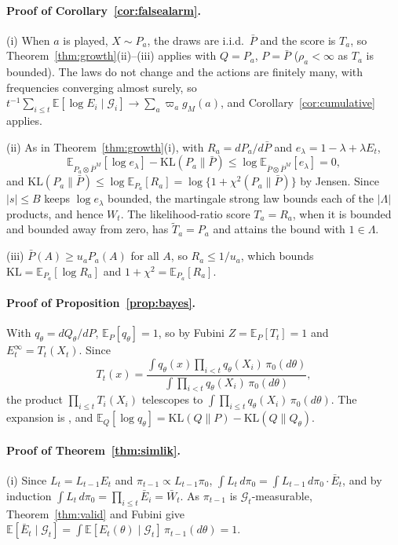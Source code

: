 \documentclass[12pt]{article}
\newcommand{\E}{\mathbb{E}}
\newcommand{\KL}{\mathrm{KL}}
\newcommand{\G}{\mathcal{G}}
\theoremstyle{remark}
\begin{document}
\paragraph{Proof of Corollary~\ref{cor:falsealarm}.}
(i) When $a$ is played, $X \sim P_a$, the draws are i.i.d.\ $\bar P$ and the
score is $T_a$, so Theorem~\ref{thm:growth}(ii)--(iii) applies with $Q = P_a$,
$P = \bar P$ ($\rho_a < \infty$ as $T_a$ is bounded). The laws do not change and
the actions are finitely many, with frequencies converging almost surely, so
$t^{-1}\sum_{i \le t}\E[\log E_i \mid \G_i] \to \sum_a \varpi_a g_M(a)$, and
Corollary~\ref{cor:cumulative} applies.

(ii) As in Theorem~\ref{thm:growth}(i), with $R_a = dP_a/d\bar P$ and
$e_\lambda = 1 - \lambda + \lambda E_t$,
\[
\E_{P_a \otimes \bar P^M}[\log e_\lambda] - \KL(P_a\|\bar P)
\le \log \E_{\bar P \otimes \bar P^M}[e_\lambda] = 0,
\]
and $\KL(P_a\|\bar P) \le \log\E_{P_a}[R_a] = \log\{1 + \chi^2(P_a\|\bar P)\}$ by
Jensen. Since $|s| \le B$ keeps $\log e_\lambda$ bounded, the martingale strong
law bounds each of the $|\Lambda|$ products, and hence $W_t$. The
likelihood-ratio score $T_a = R_a$, when it is bounded and bounded away from
zero, has $\tilde T_a = P_a$ and attains the bound with $1 \in \Lambda$.

(iii) $\bar P(A) \ge u_a P_a(A)$ for all $A$, so $R_a \le 1/u_a$, which bounds
$\KL = \E_{P_a}[\log R_a]$ and $1 + \chi^2 = \E_{P_a}[R_a]$.

\paragraph{Proof of Proposition~\ref{prop:bayes}.}
With $q_\theta = dQ_\theta/dP$, $\E_P[q_\theta] = 1$, so by Fubini
$Z = \E_P[T_t] = 1$ and $E_t^\infty = T_t(X_t)$. Since
\[
T_t(x) = \frac{\int q_\theta(x) \prod_{i<t} q_\theta(X_i)\,\pi_0(d\theta)}
{\int \prod_{i<t} q_\theta(X_i)\,\pi_0(d\theta)},
\]
the product $\prod_{i \le t} T_i(X_i)$ telescopes to
$\int \prod_{i \le t} q_\theta(X_i)\,\pi_0(d\theta)$. The expansion is
\citet{clarke1990information}, and $\E_Q[\log q_\theta] = \KL(Q\|P) - \KL(Q\|Q_\theta)$.

\paragraph{Proof of Theorem~\ref{thm:simlik}.}
(i) Since $L_t = L_{t-1}E_t$ and $\pi_{t-1} \propto L_{t-1}\pi_0$,
$\int L_t\, d\pi_0 = \int L_{t-1}\,d\pi_0 \cdot \bar E_t$, and by induction
$\int L_t\,d\pi_0 = \prod_{i \le t}\bar E_i = \bar W_t$. As $\pi_{t-1}$ is
$\G_t$-measurable, Theorem~\ref{thm:valid} and Fubini give
$\E[\bar E_t \mid \G_t] = \int \E[E_t(\theta) \mid \G_t]\,\pi_{t-1}(d\theta) = 1$.
\end{document}
